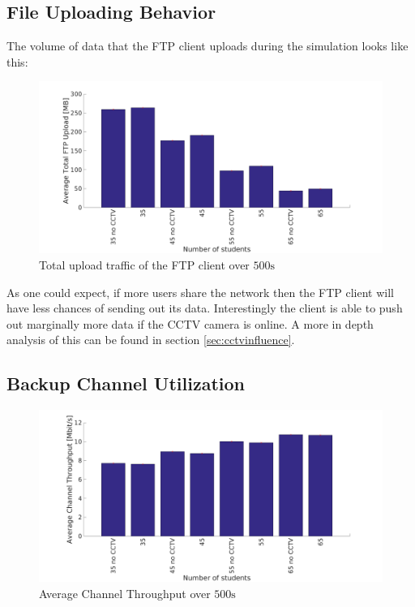 \documentclass[a4paper]{scrreprt}
\begin{document}
		\subsection{File Uploading Behavior}\label{sec:ftp}		
			The volume of data that the FTP client uploads during the simulation looks like this:
			\begin{figure}[H]
				\center\includegraphics[width=\textwidth]{../Results_Analysis/FTP/ftp.png}
				\caption{Total upload traffic of the FTP client over $500\text{s}$}
				\label{fig:ftp}
			\end{figure}		
			
			As one could expect, if more users share the network then the FTP client will have less chances of sending out its data. Interestingly the client is able to push out marginally more data if the CCTV camera is online. A more in depth analysis of this can be found in section \ref{sec:cctvinfluence}.
			
		\subsection{Backup Channel Utilization}
			\begin{figure}[H]
				\center\includegraphics[width=\textwidth]{../Results_Analysis/ChannelThroughput/channel_throughput.png}
				\caption{Average Channel Throughput over $500\text{s}$}
				\label{fig:channelthroughput}
			\end{figure}	
			
\end{document}
